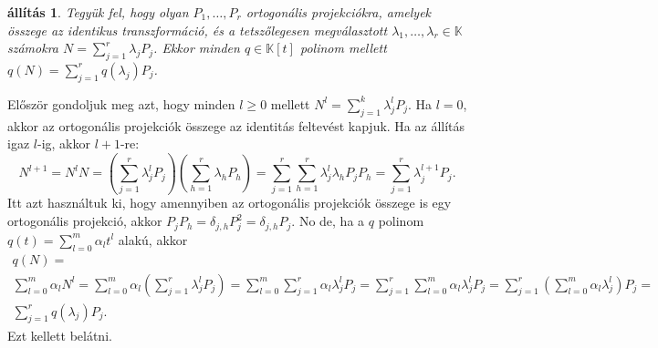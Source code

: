 \documentclass[a4paper, showtrims]{memoir}
\makeatletter
\renewenvironment{proof}[1][\proofname]
    {\par\pushQED{\qed}%
    \normalfont \topsep6\p@\@plus6\p@\relax
    \trivlist
    \item[\hskip\labelsep
        \itshape
    #1\@addpunct{:}]\ignorespaces}
    {\popQED\endtrivlist\@endpefalse}
\theoremstyle{plain}
\newtheorem{proposition}{állítás}[chapter]
\theoremstyle{remark}
\theoremstyle{definition}
\makeatother
\begin{document}
\begin{proposition}\label{pr:normpol}
	Tegyük fel, hogy olyan
	$P_1,\ldots,P_r$ ortogonális projekciókra, amelyek összege az identikus transzformáció,
	és a tetszőlegesen megválasztott
	$\lambda_1,\ldots,\lambda_r\in\mathbb{K}$ számokra $N=\sum_{j=1}^r\lambda_jP_j$.
	Ekkor minden $q\in\mathbb{K}[t]$ polinom mellett
	$q\left( N \right)=\sum_{j=1}^rq( \lambda_j )P_j$.
\end{proposition}
\begin{proof}
	Először gondoljuk meg azt, hogy minden $l\geq 0$ mellett
	\begin{math}
		N^l
		=
		\sum_{j=1}^k\lambda_j^lP_j.
	\end{math}
	Ha $l=0$, akkor az ortogonális projekciók összege az identitás feltevést kapjuk.
	Ha az állítás igaz $l$-ig, akkor $l+1$-re:
	\[
		N^{l+1}
		=
		N^lN
		=
		\left( \sum_{j=1}^r\lambda_j^lP_j \right)\left( \sum_{h=1}^r\lambda_hP_h \right)
		=
		\sum_{j=1}^r\sum_{h=1}^r\lambda_j^l\lambda_hP_jP_h
		=
		\sum_{j=1}^r\lambda_j^{l+1}P_j.
	\]
	Itt azt használtuk ki, hogy amennyiben az ortogonális projekciók összege is egy ortogonális projekció,
	akkor $P_jP_h=\delta_{j,h}P_j^2=\delta_{j,h}P_j$.
	No de, ha a $q$ polinom $q\left( t \right)=\sum_{l=0}^m\alpha_lt^l$ alakú,
	akkor
	\begin{multline*}
		q\left( N \right)
		=
        \\
		\sum_{l=0}^m\alpha_lN^l
		=
		\sum_{l=0}^m\alpha_l
		\left(
		\sum_{j=1}^r\lambda_j^lP_j
		\right)
		=
		\sum_{l=0}^m\sum_{j=1}^r\alpha_l\lambda_j^lP_j
        =
		\sum_{j=1}^r\sum_{l=0}^m\alpha_l\lambda_j^lP_j
		=
		\sum_{j=1}^r
		\left(
		\sum_{l=0}^m\alpha_l\lambda_j^l
		\right)P_j
		=
        \\
		\sum_{j=1}^r
		q\left(\lambda_j \right)P_j.
	\end{multline*}
	Ezt kellett belátni.
\end{proof}
\end{document}
